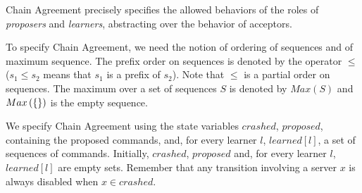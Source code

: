 Chain Agreement precisely specifies the allowed behaviors of the roles of \emph{proposers}
and \emph{learners}, abstracting over the behavior of acceptors. 

\begin{comment}
We suppose that each server can play a number of \emph{roles}.
Chain Agreement specifies the allowed behaviors the roles of \emph{proposers}
and \emph{learners}. Proposers receive commands from the clients of the service
and propose them for execution by the replicated service. Each learner learns about
a growing sequence of commands. Thanks to the sequential specification of the
service, a sequence of commands determines an output for each the included commands. 
In a traditional SMR algorithm, servers can also play the role of
\emph{acceptors}, whose task is to collectively order commands and let the
learners know about the latest sequence of ordered commands.

The point of Chain Agreement is to implement a replicated service by having every learner learn about a growing sequence of commands, which
represent an execution of the sequential specification of the service.
Crucially, at all times, the sequences of commands learned by the
different learners must form a chain in the prefix order on sequences.
Moreover, for every command $c$ proposed by a correct proposer, every
correct learner must eventually learn a sequence containing $c$.  Once
a learner learns about a sequence containing a command $c$, it can
determine the output produced by $c$, using the sequential
specification of the service, and respond to the client that issued
the command $c$.
\end{comment}

To specify Chain Agreement, we need the notion of ordering of sequences and of
maximum sequence.  The prefix order on sequences is denoted by the operator
$\leq$ ($s_1 \leq s_2$ means that $s_1$ is a prefix of $s_2$). 
Note that $\leq$ is a partial order on sequences. The maximum over a set of
sequences $S$ is denoted by $Max\left( S \right)$ and $Max\left( \left\{\right\}
\right)$ is the empty sequence.

We specify Chain Agreement using the state variables $crashed$, $proposed$, containing the proposed commands,
and, for every learner $l$,  $learned\left[ l \right]$, a set of
sequences of commands. Initially, $crashed$, $proposed$ and, for every learner $l$,
$learned\left[ l \right]$ are empty sets. 
Remember that any transition involving a server $x$ is always disabled when $x\in crashed$. 

